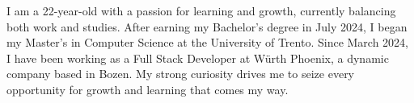 

\begin{cvparagraph}

	I am a 22-year-old with a passion for learning and growth, currently balancing both work and studies. After earning my Bachelor's degree in July 2024, I began my Master's in Computer Science at the University of Trento. Since March 2024, I have been working as a Full Stack Developer at Würth Phoenix, a dynamic company based in Bozen. My strong curiosity drives me to seize every opportunity for growth and learning that comes my way.
\end{cvparagraph}
